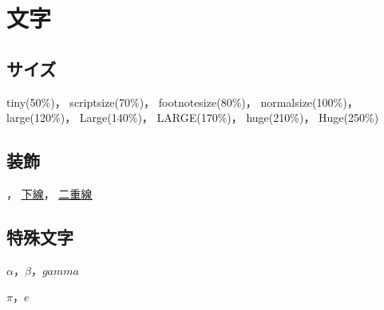 \section{文字}
\subsection{サイズ}
{\tiny tiny(50\%)}，
{\scriptsize scriptsize(70\%)}，
{\footnotesize footnotesize(80\%)}，
{\normalsize normalsize(100\%)}，
{\large large(120\%)}，
{\Large Large(140\%)}，
{\LARGE LARGE(170\%)}，
{\huge huge(210\%)}，
{\Huge Huge(250\%)}


\subsection{装飾}
，
\underline{下線}，
\underline{\underline{二重線}}


\subsection{特殊文字}
$\alpha$，$\beta$，$gamma$

$\pi$，$e$
